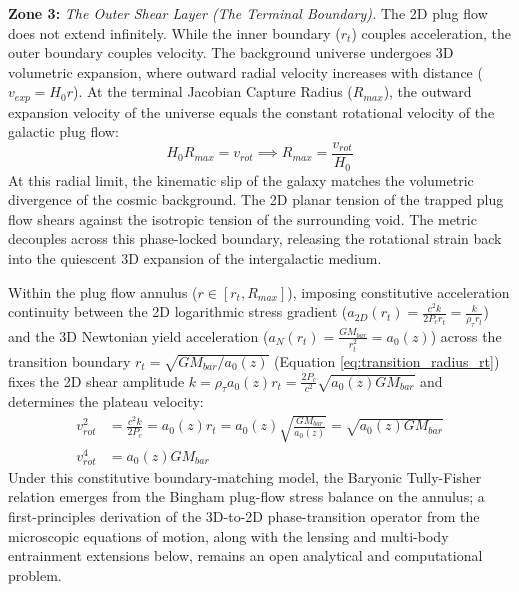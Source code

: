 \textbf{Zone 3:}  \textit{The Outer Shear Layer (The Terminal Boundary).}
The 2D plug flow does not extend infinitely.  While the inner boundary ($r_t$) couples acceleration, the outer boundary couples velocity. The background universe undergoes 3D volumetric expansion, where outward radial velocity increases with distance ($v_{exp} = H_0 r$). At the terminal Jacobian Capture Radius ($R_{max}$), the outward expansion velocity of the universe equals the constant rotational velocity of the galactic plug flow:
\begin{equation}
    H_0 R_{max} = v_{rot} \implies R_{max} = \frac{v_{rot}}{H_0}
\end{equation}
At this radial limit, the kinematic slip of the galaxy matches the volumetric divergence of the cosmic background.  The 2D planar tension of the trapped plug flow shears against the isotropic tension of the surrounding void. The metric decouples across this phase-locked boundary, releasing the rotational strain back into the quiescent 3D expansion of the intergalactic medium. 
\vspace{0.2 cm}

Within the plug flow annulus ($r \in [r_t, R_{max}]$), imposing constitutive acceleration continuity between the 2D logarithmic stress gradient ($a_{2D}(r_t) = \frac{c^2 k}{2 P_c r_t} = \frac{k}{\rho_\tau r_t}$) and the 3D Newtonian yield acceleration ($a_N(r_t) = \frac{G M_{bar}}{r_t^2} = a_0(z)$) across the transition boundary $r_t = \sqrt{G M_{bar}/a_0(z)}$ (Equation \ref{eq:transition_radius_rt}) fixes the 2D shear amplitude $k = \rho_\tau a_0(z) r_t = \frac{2P_c}{c^2}\sqrt{a_0(z) G M_{bar}}$ and determines the plateau velocity: %
\begin{align}
    v_{rot}^2 &= \frac{c^2 k}{2 P_c} = a_0(z) r_t = a_0(z) \sqrt{\frac{G M_{bar}}{a_0(z)}} = \sqrt{a_0(z) G M_{bar}} \nonumber \\ %
    v_{rot}^4 &= a_0(z) G M_{bar} \label{eq:tully_fisher_derivation}
\end{align}
Under this constitutive boundary-matching model, the Baryonic Tully-Fisher relation emerges from the Bingham plug-flow stress balance on the annulus; a first-principles derivation of the 3D-to-2D phase-transition operator from the microscopic equations of motion, along with the lensing and multi-body entrainment extensions below, remains an open analytical and computational problem. %

